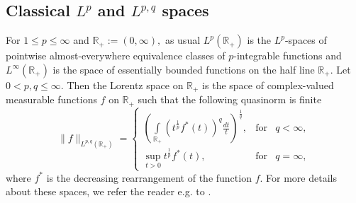 \documentclass[a4paper,12pt]{amsart}
\numberwithin{equation}{section}
\theoremstyle{definition}
\begin{document}
\subsection{Classical $L^p$ and $L^{p,q}$ spaces}
For $1\leq  p\leq\infty$ and $\mathbb{R}_{+}:=(0,\infty),$ as usual $L^p(\mathbb{R}_{+})$ is the $L^p$-spaces of pointwise almost-everywhere equivalence classes of $p$-integrable functions and $L^{\infty}(\mathbb{R}_{+})$ is the space of essentially bounded functions on the half line $\mathbb{R}_{+}.$ Let $0<  p,q\leq\infty.$ Then the Lorentz space on $\mathbb{R}_{+}$ is the space of complex-valued measurable functions $f$ on $\mathbb{R}_{+}$ such that the following quasinorm is finite 
$$\|f\|_{L^{p,q}(\mathbb{R}_{+})}=\left\{ \begin{array}{rcl}
         \left(\int\limits_{\mathbb{R}_{+}}\left(t^{\frac{1}{p}}f^*(t)\right)^q\frac{dt}{t}\right)^{\frac{1}{q}}, & \mbox{for}
         & q<\infty, \\ \sup\limits_{t>0}t^\frac{1}{p}f^*(t),\;\;\;\;\;\;\;\;\;\;\;\; & \mbox{for} & q=\infty,  
                \end{array}\right. 
$$
where $f^*$ is the decreasing rearrangement of the function $f.$ For more details about these spaces, we refer the reader e.g. to \cite{G2008}. 
\end{document}
